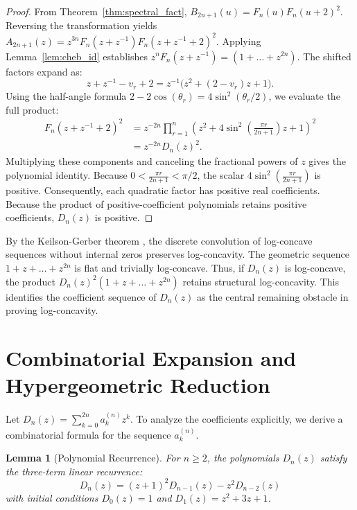 \documentclass[11pt]{article}
\newtheorem{lemma}[theorem]{Lemma}
\begin{document}
\begin{proof}
From Theorem~\ref{thm:spectral_fact}, $B_{2n+1}(u) = F_n(u)F_n(u+2)^2$. Reversing the transformation yields $A_{2n+1}(z) = z^{3n} F_n(z+z^{-1}) F_n(z+z^{-1}+2)^2$. Applying Lemma~\ref{lem:cheb_id} establishes $z^n F_n(z+z^{-1}) = (1 + \dots + z^{2n})$. The shifted factors expand as:
\begin{equation*}
z+z^{-1} - v_r + 2 = z^{-1}\big(z^2 + (2-v_r)z + 1\big).
\end{equation*}
Using the half-angle formula $2 - 2\cos(\theta_r) = 4\sin^2(\theta_r/2)$, we evaluate the full product:
\begin{align*}
F_n(z+z^{-1}+2)^2 &= z^{-2n} \prod_{r=1}^n \left(z^2 + 4\sin^2\left(\frac{\pi r}{2n+1}\right)z + 1\right)^2 \\
&= z^{-2n} D_n(z)^2.
\end{align*}
Multiplying these components and canceling the fractional powers of $z$ gives the polynomial identity. Because $0 < \frac{\pi r}{2n+1} < \pi/2$, the scalar $4\sin^2\left(\frac{\pi r}{2n+1}\right)$ is positive. Consequently, each quadratic factor has positive real coefficients. Because the product of positive-coefficient polynomials retains positive coefficients, $D_n(z)$ is positive.
\end{proof}

By the Keilson-Gerber theorem \cite{Keilson1971}, the discrete convolution of log-concave sequences without internal zeros preserves log-concavity. The geometric sequence $1+z+\dots+z^{2n}$ is flat and trivially log-concave. Thus, if $D_n(z)$ is log-concave, the product $D_n(z)^2(1+z+\dots+z^{2n})$ retains structural log-concavity. This identifies the coefficient sequence of $D_n(z)$ as the central remaining obstacle in proving log-concavity.

\section{Combinatorial Expansion and Hypergeometric Reduction} \label{sec:HyperGeomRed}

Let $D_n(z) = \sum_{k=0}^{2n} a_k^{(n)} z^k$. To analyze the coefficients explicitly, we derive a combinatorial formula for the sequence $a_k^{(n)}$. 

\begin{lemma}[Polynomial Recurrence]
For $n \ge 2$, the polynomials $D_n(z)$ satisfy the three-term linear recurrence:
\begin{equation}
D_n(z) = (z+1)^2 D_{n-1}(z) - z^2 D_{n-2}(z)
\end{equation}
with initial conditions $D_0(z) = 1$ and $D_1(z) = z^2+3z+1$.
\end{lemma}
\end{document}
